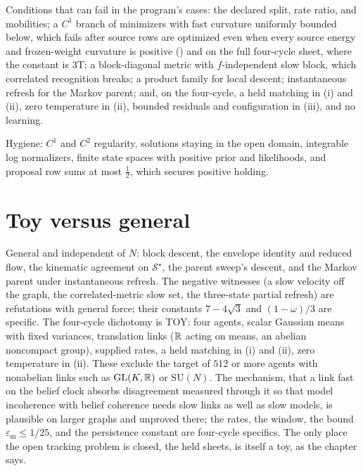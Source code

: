 \begin{hygiene}
Conditions that can fail in the program's cases: the declared split, rate ratio, and mobilities; a
$C^1$ branch of minimizers with fast curvature uniformly bounded below, which fails after source rows
are optimized even when every source energy and frozen-weight curvature is positive
() and on the full four-cycle sheet, where the constant is
$3\mathrm T$; a block-diagonal metric with $f$-independent slow block, which correlated recognition
breaks; a product family for local descent; instantaneous refresh for the Markov parent; and, on the
four-cycle, a held matching in (i) and (ii), zero temperature in (ii), bounded residuals and
configuration in (iii), and no learning.

Hygiene: $C^1$ and $C^2$ regularity, solutions staying in the open domain, integrable log normalizers,
finite state spaces with positive prior and likelihoods, and proposal row sums at most $\tfrac12$,
which secures positive holding.
\end{hygiene}

\section{Toy versus general}
\label{comp:ch08-toy}

General and independent of $N$: block descent, the envelope identity and reduced flow, the kinematic
agreement on $\mathcal S^\star$, the parent sweep's descent, and the Markov parent under instantaneous
refresh. The negative witnesses (a slow velocity off the graph, the correlated-metric slow set, the
three-state partial refresh) are refutations with general force; their constants $7-4\sqrt3$ and
$(1-\omega)/3$ are specific. The four-cycle dichotomy is TOY: four agents, scalar Gaussian means with
fixed variances, translation links ($\mathbb R$ acting on means, an abelian noncompact group), supplied rates,
a held matching in (i) and (ii), zero temperature in (ii). These exclude the target of $512$ or more
agents with nonabelian links such as $\mathrm{GL}(K,\mathbb R)$ or $\mathrm{SU}(N)$. The mechanism, that a link fast
on the belief clock absorbs disagreement measured through it so that model incoherence with belief
coherence needs slow links as well as slow models, is plausible on larger graphs and unproved there;
the rates, the window, the bound $\varepsilon_{\mathrm m}\leq1/25$, and the persistence constant are
four-cycle specifics. The only place the open tracking problem is closed, the held sheets, is itself a
toy, as the chapter says.

